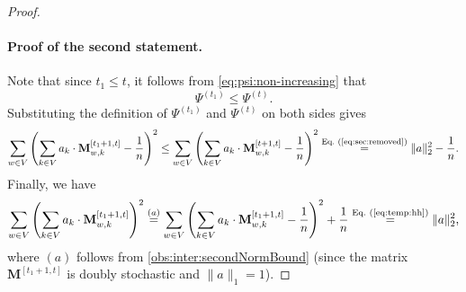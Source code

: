 \documentclass[twoside,leqno]{article}
\newcommand{\M}{\mathbf{M}}
\DeclareMathOperator{\1}{\mathbf{1}}
\numberwithin{equation}{section}
\begin{document}
\begin{proof}
\paragraph{Proof of the second statement.}
Note that since $t_1 \le t$, it follows from \cref{eq:psi:non-increasing} that
\[ \Psi^{(t_1)} \le \Psi^{(t)}.\]
Substituting the definition of $\Psi^{(t_1)}$ and $\Psi^{(t)}$ on both sides gives
\begin{equation}\label{eq:temp:hh}
\sum_{w\in V}\left(\sum_{k\in V} a_k\cdot \M_{w,k}^{[t_1+1,t]}-\frac{1}{n}\right)^2 \le \sum_{w\in V}\left(\sum_{k\in V} a_k\cdot \M_{w,k}^{[t+1,t]}-\frac{1}{n}\right)^2 \overset{\text{Eq.~(\ref{eq:sec:removed})}}{=} \|a\|_2^2-\frac{1}{n}.
\end{equation}
Finally, we have
\begin{align*}
\sum_{w\in V}\left(\sum_{k\in V} a_k\cdot \M_{w,k}^{[t_1+1,t]}\right)^2 \stackrel{(a)}{=} \sum_{w\in V} \left( \sum_{k\in V} a_k\cdot \M_{w,k}^{[t_1+1,t]} -\frac{1}{n}\right)^2 + \frac{1}{n} \overset{\text{Eq.~(\ref{eq:temp:hh})}}{=} \|a\|_2^2 ,
\end{align*}
where $(a)$ follows from \cref{obs:inter:secondNormBound} (since the matrix $\M^{[t_1+1,t]}$ is doubly stochastic and $\|a\|_1=1$).
\end{proof}
\end{document}

